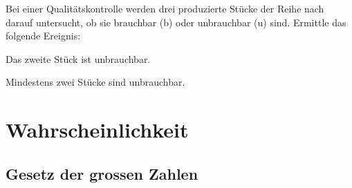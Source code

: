 \documentclass[%
11pt,%
twoside,%
titlepage,%
german,%
headsepline%
]{scrartcl}
\begin{document}

\begin{ueb}[Qualitätskontrolle]
Bei einer Qualitätskontrolle werden drei produzierte Stücke der Reihe nach darauf untersucht, ob sie brauchbar (b) oder unbrauchbar (u) sind. Ermittle das folgende Ereignis:
\begin{enumeratea}
\item Das zweite Stück ist unbrauchbar.
\item Mindestens zwei Stücke sind unbrauchbar.
\end{enumeratea}
\end{ueb}

\section{Wahrscheinlichkeit}

\subsection{Gesetz der grossen Zahlen}
\end{document}

